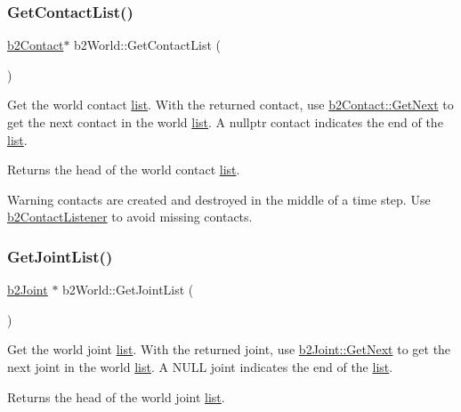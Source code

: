 \subsubsection{\texorpdfstring{Get\+Contact\+List()}{GetContactList()}\hspace{0.1cm}{\footnotesize\ttfamily [2/2]}}
{\footnotesize\ttfamily \hyperlink{classb2Contact}{b2\+Contact}$\ast$ b2\+World\+::\+Get\+Contact\+List (\begin{DoxyParamCaption}{ }\end{DoxyParamCaption})}

Get the world contact \hyperlink{protocollist-p}{list}. With the returned contact, use \hyperlink{classb2Contact_aebfebb1e4b27dc0bd7aa120093e3d650}{b2\+Contact\+::\+Get\+Next} to get the next contact in the world \hyperlink{protocollist-p}{list}. A nullptr contact indicates the end of the \hyperlink{protocollist-p}{list}. \begin{DoxyReturn}{Returns}
the head of the world contact \hyperlink{protocollist-p}{list}. 
\end{DoxyReturn}
\begin{DoxyWarning}{Warning}
contacts are created and destroyed in the middle of a time step. Use \hyperlink{classb2ContactListener}{b2\+Contact\+Listener} to avoid missing contacts. 
\end{DoxyWarning}
\mbox{\label{classb2World_a55db7240f8290aa02cab79f181934de8}} 
\subsubsection{\texorpdfstring{Get\+Joint\+List()}{GetJointList()}\hspace{0.1cm}{\footnotesize\ttfamily [1/2]}}
{\footnotesize\ttfamily \hyperlink{classb2Joint}{b2\+Joint} $\ast$ b2\+World\+::\+Get\+Joint\+List (\begin{DoxyParamCaption}{ }\end{DoxyParamCaption})\hspace{0.3cm}{\ttfamily [inline]}}

Get the world joint \hyperlink{protocollist-p}{list}. With the returned joint, use \hyperlink{classb2Joint_a1a0e2137b631010750c728cb4e276e5d}{b2\+Joint\+::\+Get\+Next} to get the next joint in the world \hyperlink{protocollist-p}{list}. A N\+U\+LL joint indicates the end of the \hyperlink{protocollist-p}{list}. \begin{DoxyReturn}{Returns}
the head of the world joint \hyperlink{protocollist-p}{list}. 
\end{DoxyReturn}
\mbox{\label{classb2World_a35adb43a8cfd186a176e086d49908bff}} 
